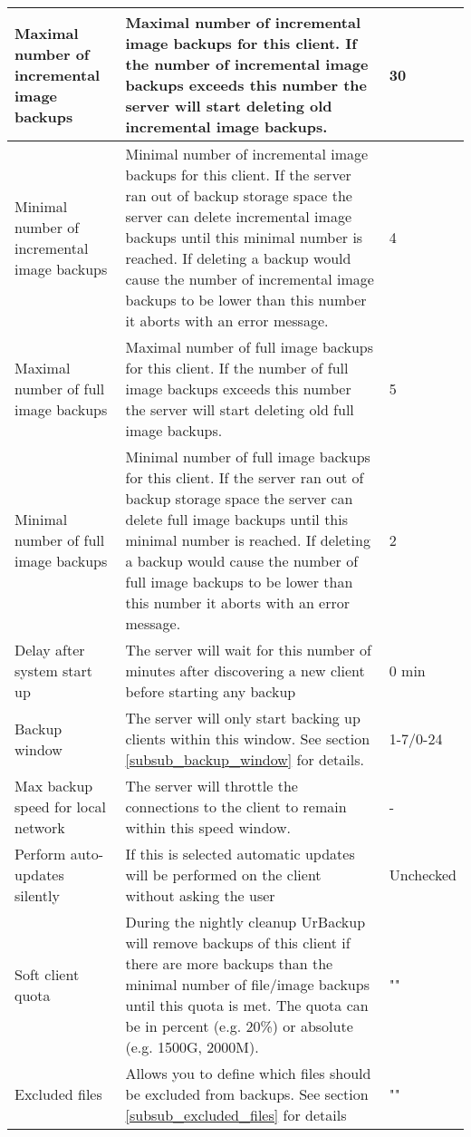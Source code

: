 \documentclass[a4paper,10pt]{article}
\begin{document}
\begin{longtable}{|p{}|p{}|p{}|}
\hline
Maximal number of incremental image backups & Maximal number of incremental image backups for this client. If the number of incremental image backups exceeds this number the server will start deleting old incremental image backups. & 30\\
\hline
Minimal number of incremental image backups & Minimal number of incremental image backups for this client. If the server ran out of backup storage space the server can delete incremental image backups until this minimal number is reached. If deleting a backup would cause the number of incremental image backups to be lower than this number it aborts with an error message. & 4\\
\hline
Maximal number of full image backups & Maximal number of full image backups for this client. If the number of
 full image backups exceeds this number the server will start deleting old full image backups. & 5\\
\hline
Minimal number of full image backups & Minimal number of full image backups for this client. If the server ran out of backup storage space the server can delete full image backups until this minimal number is reached. If deleting a backup would cause the number of full image backups to be lower than this number it aborts with an error message. & 2\\
\hline
Delay after system start up & The server will wait for this number of minutes after discovering a new client before starting any backup & 0 min\\
\hline
Backup window & The server will only start backing up clients within this window. See section \ref{subsub_backup_window} for details. & 1-7/0-24\\
\hline
Max backup speed for local network & The server will throttle the connections to the client to remain within this speed window. & -\\
\hline
Perform auto-updates silently & If this is selected automatic updates will be performed on the client without asking the user & Unchecked\\
\hline
Soft client quota & During the nightly cleanup UrBackup will remove backups of this client
if there are more backups than the minimal number of file/image backups until this quota is met. The quota can be in percent (e.g. 20\%) or
absolute (e.g. 1500G, 2000M). & "" \\
\hline
Excluded files & Allows you to define which files should be excluded from backups. See section \ref{subsub_excluded_files} for details & "" \\

\end{longtable}
\end{document}
